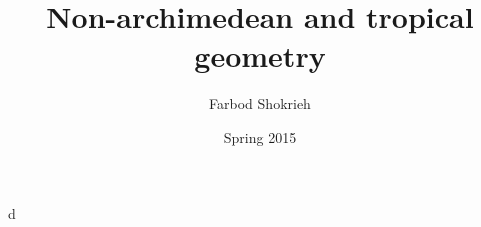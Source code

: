 \documentclass[oneside]{article}
\title{Non-archimedean and tropical geometry}
\author{Farbod Shokrieh}
\date{Spring 2015}
\begin{document}
\maketitle





d
\end{document}
